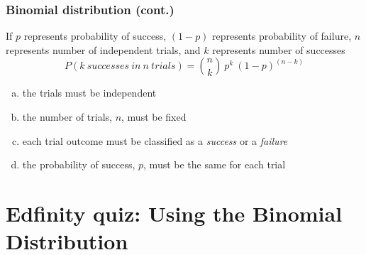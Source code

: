 \documentclass[slidestop,compress,mathserif]{beamer}
\begin{document}


\begin{frame}
\frametitle{Binomial distribution (cont.)}

{
If $p$ represents probability of success, $(1-p)$ represents probability of failure, $n$ represents number of independent trials, and $k$ represents number of successes 
\[P(k~successes~in~n~trials) = {n \choose k}~p^k~(1-p)^{(n-k)} \]
} 


\end{frame}


\begin{frame}


\begin{enumerate}[(a)]
\item the trials must be independent
\item the number of trials, $n$, must be fixed
\item each trial outcome must be classified as a \textit{success} or a \textit{failure}
\item the probability of success, $p$, must be the same for each trial
\end{enumerate}

\end{frame}


\section{Edfinity quiz: Using the Binomial Distribution}





\end{document}
